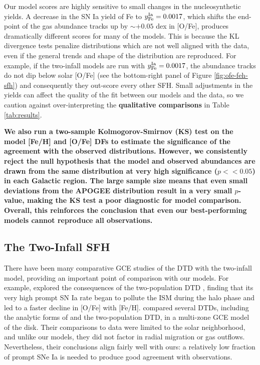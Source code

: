 \documentclass[twocolumn,twocolappendix,linenumbers]{aastex631}
\begin{document}
Our model scores are highly sensitive to small changes in the nucleosynthetic yields. A decrease in the SN Ia yield of Fe to $y_{\rm Fe}^{\rm Ia}=0.0017$, which shifts the end-point of the gas abundance tracks up by $\sim+0.05$ dex in [O/Fe], produces dramatically different scores for many of the models. This is because the KL divergence tests penalize distributions which are not well aligned with the data, even if the general trends and shape of the distribution are reproduced. For example, if the two-infall models are run with $y_{\rm Fe}^{\rm Ia}=0.0017$, the abundance tracks do not dip below solar [O/Fe] (see the bottom-right panel of Figure \ref{fig:ofe-feh-sfh}) and consequently they out-score every other SFH. Small adjustments in the yields can affect the quality of the fit between our models and the data, so we caution against over-interpreting the {\bf qualitative comparisons} in Table \ref{tab:results}.

{\bf We also run a two-sample Kolmogorov-Smirnov (KS) test on the model [Fe/H] and [O/Fe] DFs to estimate the significance of the agreement with the observed distributions. However, we consistently reject the null hypothesis that the model and observed abundances are drawn from the same distribution at very high significance ($p<<0.05$) in each Galactic region. The large sample size means that even small deviations from the APOGEE distribution result in a very small $p$-value, making the KS test a poor diagnostic for model comparison. Overall, this reinforces the conclusion that even our best-performing models cannot reproduce all observations.}

\subsection{The Two-Infall SFH}
\label{sec:two-infall-discussion}

There have been many comparative GCE studies of the DTD with the two-infall model, providing an important point of comparison with our models. For example, \citet{Matteucci2006-BimodalDTDConsequences} explored the consequences of the two-population DTD \citep{Mannucci2006-TwoPopulations}, finding that its very high prompt SN Ia rate began to pollute the ISM during the halo phase and led to a faster decline in [O/Fe] with [Fe/H]. \citet{Matteucci2009-DTDModels} compared several DTDs, including the analytic forms of \citet{Greggio2005-AnalyticalRates} and the two-population DTD, in a multi-zone GCE model of the disk. Their comparisons to data were limited to the solar neighborhood, and unlike our models, they did not factor in radial migration or gas outflows. Nevertheless, their conclusions align fairly well with ours: a relatively low fraction of prompt SNe Ia is needed to produce good agreement with observations.
\end{document}
